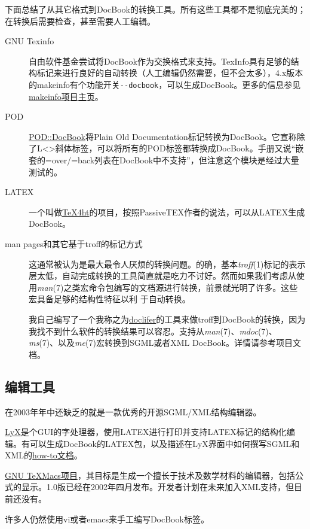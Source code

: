 \documentclass[12pt,oneside]{book}
\begin{document}
\begin{common-format}
下面总结了从其它格式到DocBook的转换工具。所有这些工具都不是彻底完美的；在转换后需要检查，甚至需要人工编辑。
\begin{description}
\item[GNU Texinfo] 自由软件基金尝试将DocBook作为交换格式来支持。TexInfo具有足够的结构标记来进行良好的自动转换（人工编辑仍然需要，但不会太多），4.x版本的makeinfo有个功能开关\verb+--docbook+，可以生成DocBook。更多的信息参见\href{http://www.gnu.org/directory/texinfo.html}{makeinfo项目主页}。
\item[POD] \href{http://www.cpan.org/modules/by-module/Pod/}{POD::DocBook}将Plain Old Documentation标记转换为DocBook。它宣称除了L<>斜体标签，可以将所有的POD标签都转换成DocBook。手册又说“嵌套的=over/=back列表在DocBook中不支持”，但注意这个模块是经过大量测试的。
\item[LATEX] 一个叫做\href{http://www.lrz-muenchen.de/services/software/sonstiges/tex4ht/mn.html}{TeX4ht}的项目，按照PassiveTEX作者的说法，可以从LATEX生成DocBook。
\item[man pages和其它基于troff的标记方式] 这通常被认为是最大最令人厌烦的转换问题。的确，基本\textit{troff}(1)标记的表示层太低，自动完成转换的工具简直就是吃力不讨好。然而如果我们考虑从使用\textit{man}(7)之类宏命令包编写的文档源进行转换，前景就光明了许多。这些宏具备足够的结构性特征以利
于自动转换。

我自己编写了一个我称之为\href{http://www.catb.org/~esr/doclifter/}{doclifer}的工具来做troff到DocBook的转换，因为我找不到什么软件的转换结果可以容忍。支持从\textit{man}(7)、\textit{mdoc}(7)、\textit{ms}(7)、以及\textit{me}(7)宏转换到SGML或者XML DocBook。详情请参考项目文档。
\end{description}

\subsection{编辑工具}
在2003年年中还缺乏的就是一款优秀的开源SGML/XML结构编辑器。

\href{http://www.lyx.org/}{LyX}是个GUI的字处理器，使用LATEX进行打印并支持LATEX标记的结构化编辑。有可以生成DocBook的LATEX包，以及描述在LyX界面中如何撰写SGML和XML的\href{http://bgu.chez.tiscali.fr/doc/db4lyx/}{how-to文档}。

\href{http://www.math.u-psud.fr/~anh/TeXmacs/TeXmacs.html}{GNU TeXMacs项目}，其目标是生成一个擅长于技术及数学材料的编辑器，包括公式的显示。1.0版已经在2002年四月发布。开发者计划在未来加入XML支持，但目前还没有。

许多人仍然使用vi或者emacs来手工编写DocBook标签。


\end{common-format}
\end{document}
